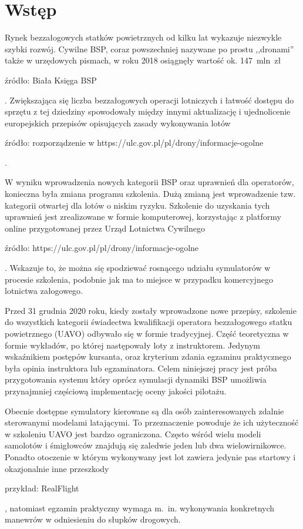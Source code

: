 \newpage
\section{Wstęp}

Rynek bezzałogowych statków powietrznych od kilku lat wykazuje niezwykle szybki rozwój. Cywilne BSP, coraz powszechniej nazywane po prostu ,,dronami'' także w urzędowych pismach, w roku 2018 osiągnęły wartość ok. 147~mln~zł \begin{todo}źródło: Biała Księga BSP\end{todo}. Zwiększająca się liczba bezzałogowych operacji lotniczych i łatwość dostępu do sprzętu z tej dziedziny spowodowały między innymi aktualizację i ujednolicenie europejskich przepisów opisujących zasady wykonywania lotów \begin{todo}źródło: rozporządzenie w https://ulc.gov.pl/pl/drony/informacje-ogolne\end{todo}.

W wyniku wprowadzenia nowych kategorii BSP oraz uprawnień dla operatorów, konieczna była zmiana programu szkolenia. Dużą zmianą jest wprowadzenie tzw. kategorii otwartej dla lotów o niskim ryzyku. Szkolenie do uzyskania tych uprawnień jest zrealizowane w formie komputerowej, korzystając z platformy online przygotowanej przez Urząd Lotnictwa Cywilnego \begin{todo}źródło: https://ulc.gov.pl/pl/drony/informacje-ogolne\end{todo}. Wskazuje to, że można się spodziewać rosnącego udziału symulatorów w procesie szkolenia, podobnie jak ma to miejsce w przypadku komercyjnego lotnictwa załogowego.

Przed 31 grudnia 2020 roku, kiedy zostały wprowadzone nowe przepisy, szkolenie do wszystkich kategorii świadectwa kwalifikacji operatora bezzałogowego statku powietrznego (UAVO) odbywało się w formie tradycyjnej. Część teoretyczna w formie wykładów, po której następowały loty z instruktorem. Jedynym wskaźnikiem postępów kursanta, oraz kryterium zdania egzaminu praktycznego była opinia instruktora lub egzaminatora. Celem niniejszej pracy jest próba przygotowania systemu który oprócz symulacji dynamiki BSP umożliwia przynajmniej częściową implementację oceny jakości pilotażu.

Obecnie dostępne symulatory kierowane są dla osób zainteresowanych zdalnie sterowanymi modelami latającymi. To przeznaczenie powoduje że ich użyteczność w szkoleniu UAVO jest bardzo ograniczona. Często wśród wielu modeli samolotów i śmigłowców znajdują się zaledwie jeden lub dwa wielowirnikowce. Ponadto otoczenie w którym wykonywany jest lot zawiera jedynie pas startowy i okazjonalnie inne przeszkody \begin{todo}przykład: RealFlight\end{todo}, natomiast egzamin praktyczny wymaga m.~in. wykonywania konkretnych manewrów w odniesieniu do słupków drogowych.
